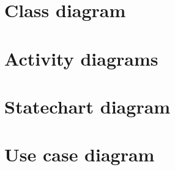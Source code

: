 \section{Class diagram}

\section{Activity diagrams}

\section{Statechart diagram}

\section{Use case diagram}
